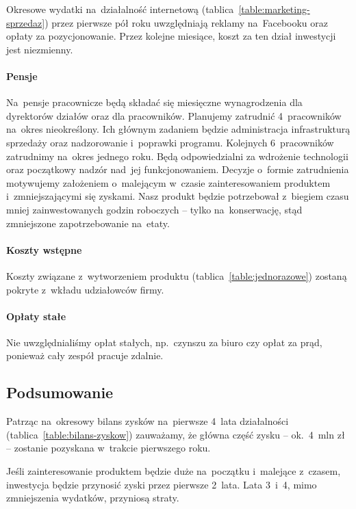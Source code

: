 \documentclass[12pt]{article}
\begin{document}
Okresowe wydatki na~działalność internetową (tablica~\ref{table:marketing-sprzedaz}) przez pierwsze pół roku uwzględniają reklamy na~Facebooku oraz opłaty za pozycjonowanie.
Przez kolejne miesiące, koszt za ten dział inwestycji jest niezmienny.

\paragraph{Pensje}

Na~pensje pracownicze będą składać się miesięczne wynagrodzenia dla dyrektorów działów oraz dla pracowników.
Planujemy zatrudnić 4~pracowników na~okres nieokreślony.
Ich głównym zadaniem będzie administracja infrastrukturą sprzedaży oraz nadzorowanie i~poprawki programu.
Kolejnych 6~pracowników zatrudnimy na~okres jednego roku.
Będą odpowiedzialni za wdrożenie technologii oraz początkowy nadzór nad~jej funkcjonowaniem.
Decyzje o~formie zatrudnienia motywujemy założeniem o~malejącym w~czasie zainteresowaniem produktem i~zmniejszającymi się zyskami.
Nasz produkt będzie potrzebował z~biegiem czasu mniej zainwestowanych godzin roboczych -- tylko na~konserwację, stąd zmniejszone zapotrzebowanie na~etaty.

\paragraph{Koszty wstępne}

Koszty związane z~wytworzeniem produktu (tablica~\ref{table:jednorazowe}) zostaną pokryte z~wkładu udziałowców firmy.

\paragraph{Opłaty stałe}

Nie uwzględnialiśmy opłat stałych, np.~czynszu za biuro czy opłat za prąd, ponieważ cały zespół pracuje zdalnie.

\subsection{Podsumowanie}

Patrząc na~okresowy bilans zysków na~pierwsze 4~lata działalności (tablica~\ref{table:bilans-zyskow}) zauważamy, że główna część zysku -- ok.~4~mln zł -- zostanie pozyskana w~trakcie pierwszego roku.

Jeśli zainteresowanie produktem będzie duże na~początku i~malejące z~czasem, inwestycja będzie przynosić zyski przez pierwsze 2~lata.
Lata 3~i~4, mimo zmniejszenia wydatków, przyniosą straty.
\end{document}
